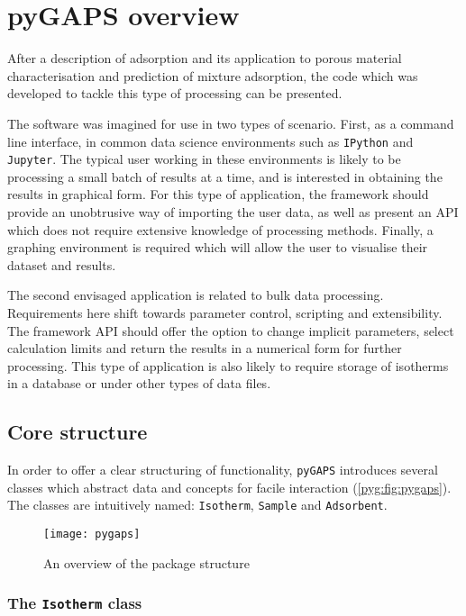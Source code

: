 
\section{pyGAPS overview}

After a description of adsorption and its application to porous
material characterisation and prediction of mixture
adsorption, the code which was developed to tackle this type 
of processing can be presented.

The software was imagined for use in two types of scenario.
First, as a command line interface, in common data science environments
such as \texttt{IPython} and \texttt{Jupyter}. The typical user working
in these environments is likely to be processing a small batch of
results at a time, and is interested in obtaining the results in
graphical form. For this type of application, the framework should
provide an unobtrusive way of importing the user data, as well as
present an API which does not require extensive knowledge of 
processing methods. Finally, a graphing environment is
required which will allow the user to visualise their
dataset and results.

The second envisaged application is related to bulk data processing.
Requirements here shift towards parameter control, scripting and
extensibility. The framework API should offer the option to change 
implicit parameters, select calculation limits and return the results
in a numerical form for further processing. This type of application 
is also likely to require storage of isotherms in a database or
under other types of data files.

\subsection{Core structure}

In order to offer a clear structuring of functionality, 
\texttt{pyGAPS} introduces several classes which abstract data and
concepts for facile interaction (\autoref{pyg:fig:pygaps}). The classes are
intuitively named: \texttt{Isotherm}, \texttt{Sample} and \texttt{Adsorbent}.

\begin{figure}[htb]
    \centering
    \texttt{[image: pygaps]}%
	\caption{An overview of the package structure}%
\label{pyg:fig:pygaps}
\end{figure}

\subsubsection{The \texttt{Isotherm} class}

